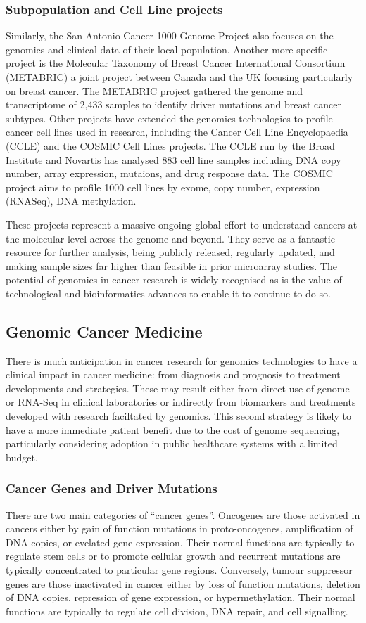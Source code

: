\subsubsection{Subpopulation and Cell Line projects}
Similarly, the San Antonio Cancer 1000 Genome Project also focuses on the genomics and clinical data of their local population. Another more specific project is the Molecular Taxonomy of Breast Cancer International Consortium (METABRIC) a joint project between Canada and the UK focusing particularly on breast cancer. The METABRIC project gathered the genome and transcriptome of 2,433 samples to identify driver mutations and breast cancer subtypes. Other projects have extended the genomics technologies to profile cancer cell lines used in research, including the Cancer Cell Line Encyclopaedia (CCLE) and the COSMIC Cell Lines projects. The CCLE run by the Broad Institute and Novartis has analysed 883 cell line samples including DNA copy number, array expression, mutaions, and  drug response data. The COSMIC project aims to profile 1000 cell lines by exome, copy number, expression (RNASeq), DNA methylation.

These projects represent a massive ongoing global effort to understand cancers at the molecular level across the genome and beyond. They serve as a fantastic resource for further analysis, being publicly released, regularly updated, and making sample sizes far higher than feasible in prior microarray studies. The potential of genomics in cancer research is widely recognised as is the value of technological and bioinformatics advances to enable it to continue to do so. 


\subsection{Genomic Cancer Medicine}
There is much anticipation in cancer research for genomics technologies to have a clinical impact in cancer medicine: from diagnosis and prognosis to treatment developments and strategies. These may result either from direct use of genome or RNA-Seq in clinical laboratories or indirectly from biomarkers and treatments developed with research faciltated by genomics. This second strategy is likely to have a more immediate patient benefit due to the cost of genome sequencing, particularly considering adoption in public healthcare systems with a limited budget.  

\subsubsection{Cancer Genes and Driver Mutations}
There are two main categories of ``cancer genes''. Oncogenes are those activated in cancers either by gain of function mutations in proto-oncogenes, amplification of DNA copies, or evelated gene expression. Their normal functions are typically to regulate stem cells or to promote cellular growth and recurrent mutations are typically concentrated to particular gene regions. Conversely, tumour suppressor genes are those inactivated in cancer either by loss of function mutations, deletion of DNA copies, repression of gene expression, or hypermethylation. Their normal functions are typically to regulate cell division, DNA repair, and cell signalling.


